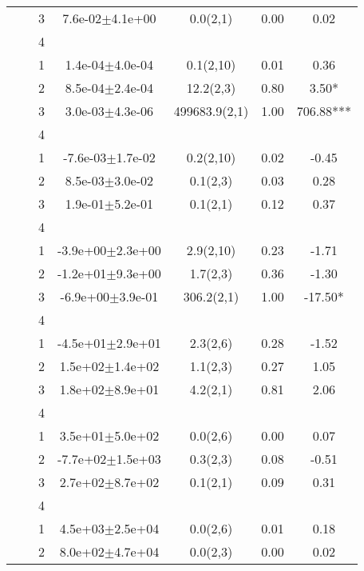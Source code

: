 \begin{longtable}{llccccS[table-format=-2.2, table-space-text-post = {***}]}
   &  & 3 &  7.6e-02$\pm$4.1e+00 & 0.0(2,1) & 0.00 & 0.02 \\ 
   &  & 4 &  &  &  &  \\ 
   \midrule
{} & {} & 1 &  1.4e-04$\pm$4.0e-04 & 0.1(2,10) & 0.01 & 0.36 \\ 
   &  & 2 &  8.5e-04$\pm$2.4e-04 & 12.2(2,3) & 0.80 & 3.50* \\ 
   &  & 3 &  3.0e-03$\pm$4.3e-06 & 499683.9(2,1) & 1.00 & 706.88*** \\ 
   &  & 4 &  &  &  &  \\ 
   \midrule
{} & {} & 1 & -7.6e-03$\pm$1.7e-02 & 0.2(2,10) & 0.02 & -0.45 \\ 
   &  & 2 &  8.5e-03$\pm$3.0e-02 & 0.1(2,3) & 0.03 & 0.28 \\ 
   &  & 3 &  1.9e-01$\pm$5.2e-01 & 0.1(2,1) & 0.12 & 0.37 \\ 
   &  & 4 &  &  &  &  \\ 
   \midrule
{} & {} & 1 & -3.9e+00$\pm$2.3e+00 & 2.9(2,10) & 0.23 & -1.71 \\ 
   &  & 2 & -1.2e+01$\pm$9.3e+00 & 1.7(2,3) & 0.36 & -1.30 \\ 
   &  & 3 & -6.9e+00$\pm$3.9e-01 & 306.2(2,1) & 1.00 & -17.50* \\ 
   &  & 4 &  &  &  &  \\ 
   \midrule
{} & {} & 1 & -4.5e+01$\pm$2.9e+01 & 2.3(2,6) & 0.28 & -1.52 \\ 
   &  & 2 &  1.5e+02$\pm$1.4e+02 & 1.1(2,3) & 0.27 & 1.05 \\ 
   &  & 3 &  1.8e+02$\pm$8.9e+01 & 4.2(2,1) & 0.81 & 2.06 \\ 
   &  & 4 &  &  &  &  \\ 
   \midrule
{} & {} & 1 &  3.5e+01$\pm$5.0e+02 & 0.0(2,6) & 0.00 & 0.07 \\ 
   &  & 2 & -7.7e+02$\pm$1.5e+03 & 0.3(2,3) & 0.08 & -0.51 \\ 
   &  & 3 &  2.7e+02$\pm$8.7e+02 & 0.1(2,1) & 0.09 & 0.31 \\ 
   &  & 4 &  &  &  &  \\ 
   \midrule
{} & {} & 1 &  4.5e+03$\pm$2.5e+04 & 0.0(2,6) & 0.01 & 0.18 \\ 
   &  & 2 &  8.0e+02$\pm$4.7e+04 & 0.0(2,3) & 0.00 & 0.02 \\ 

\end{longtable}

